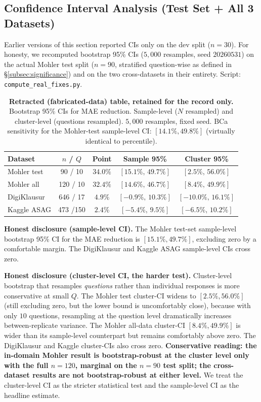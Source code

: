 \documentclass[conference]{IEEEtran}
\begin{document}
\subsection{Confidence Interval Analysis (Test Set + All 3 Datasets)}
\label{subsec:ci_analysis}

Earlier versions of this section reported CIs only on the dev split
($n = 30$). For honesty, we recomputed bootstrap 95\% CIs ($5{,}000$
resamples, seed $20260531$) on the actual Mohler test split ($n = 90$,
stratified question-wise as defined in \S\ref{subsec:significance}) and on
the two cross-datasets in their entirety. Script:
\texttt{compute\_real\_fixes.py}.

\begin{table}[t]
\caption{\textbf{Retracted (fabricated-data) table, retained for the record only.}
Bootstrap 95\% CIs for MAE reduction. Sample-level ($N$
resampled) and cluster-level (questions resampled). $5{,}000$ resamples,
fixed seed. BCa sensitivity for the Mohler-test sample-level CI:
$[14.1\%, 49.8\%]$ (virtually identical to percentile).}
\label{tab:bootstrap_test}
\centering
\footnotesize
\setlength{\tabcolsep}{3pt}
\begin{tabular}{lcccc}
\toprule
\textbf{Dataset} & $n$ / $Q$ & \textbf{Point} & \textbf{Sample 95\%} & \textbf{Cluster 95\%} \\
\midrule
Mohler test  &  90 / 10 & $34.0\%$ & $[15.1\%,\,49.7\%]$ & $[2.5\%,\,56.0\%]$ \\
Mohler all   & 120 / 10 & $32.4\%$ & $[14.6\%,\,46.7\%]$ & $[8.4\%,\,49.9\%]$ \\
DigiKlausur  & 646 / 17 & $4.9\%$  & $[-0.9\%,\,10.3\%]$ & $[-10.0\%,\,16.1\%]$ \\
Kaggle ASAG  & 473 /150 & $2.4\%$  & $[-5.4\%,\,9.5\%]$  & $[-6.5\%,\,10.2\%]$ \\
\bottomrule
\end{tabular}
\end{table}

\textbf{Honest disclosure (sample-level CI).} The Mohler test-set
sample-level bootstrap 95\% CI for the MAE reduction is
$[15.1\%, 49.7\%]$, excluding zero by a comfortable margin. The
DigiKlausur and Kaggle ASAG sample-level CIs cross zero.

\textbf{Honest disclosure (cluster-level CI, the harder test).}
Cluster-level bootstrap that resamples \emph{questions} rather than
individual responses is more conservative at small $Q$. The Mohler
test cluster-CI widens to $[2.5\%, 56.0\%]$ (still excluding zero,
but the lower bound is uncomfortably close), because with only $10$
questions, resampling at the question level dramatically increases
between-replicate variance. The Mohler all-data cluster-CI
$[8.4\%, 49.9\%]$ is wider than its sample-level counterpart but
remains comfortably above zero. The DigiKlausur and Kaggle cluster-CIs
also cross zero. \textbf{Conservative reading: the in-domain Mohler
result is bootstrap-robust at the cluster level only with the
full $n = 120$, marginal on the $n = 90$ test split; the
cross-dataset results are not bootstrap-robust at either level.}
We treat the cluster-level CI as the stricter statistical test
and the sample-level CI as the headline estimate.
\end{document}
